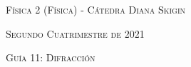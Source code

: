 \documentclass[11pt,spanish]{article}
\begin{document}
    \begin{center}
    \textsc{\large Física 2 (Física) - Cátedra Diana Skigin}
    \par\end{center}{\large \par}
    
    \begin{center}
    \textsc{\large Segundo Cuatrimestre de 2021}
    \par\end{center}{\large \par}
    
    \begin{center}
    \textsc{\large Guía 11: Difracción}
    \par\end{center}{\large \par}
\end{document}

